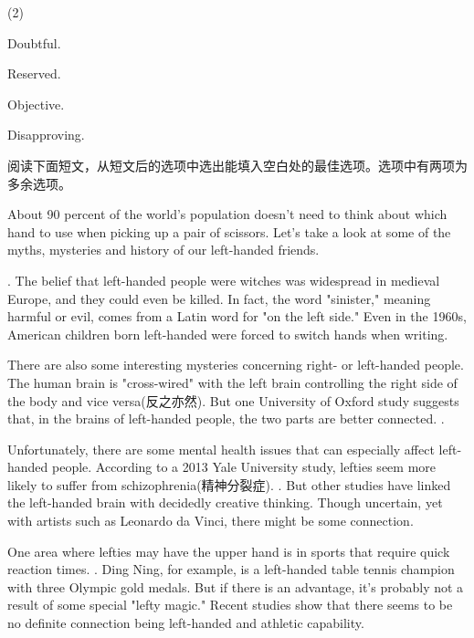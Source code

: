 \documentclass{英语试卷}
\begin{document}
\begin{choices}(2)
  \item Doubtful.
  \item Reserved.
  \item Objective.
  \item Disapproving.
\end{choices}
\par 阅读下面短文，从短文后的选项中选出能填入空白处的最佳选项。选项中有两项为多余选项。\par
\par About 90 percent of the world's population doesn't need to think about which hand to use when picking up a pair of scissors.  Let's take a look at some of the myths, mysteries and history of our left-handed friends.\par
\par {}. The belief that left-handed people were witches was widespread in medieval Europe, and they could even be killed. In fact, the word "sinister," meaning harmful or evil, comes from a Latin word for "on the left side." Even in the 1960s, American children born left-handed were forced to switch hands when writing.\par
\par There are also some interesting mysteries concerning right- or left-handed people. The human brain is "cross-wired" with the left brain controlling the right side of the body and vice versa(反之亦然). But one University of Oxford study suggests that, in the brains of left-handed people, the two parts are better connected. .\par
\par Unfortunately, there are some mental health issues that can especially affect left-handed people. According to a 2013 Yale University study, lefties seem more likely to suffer from schizophrenia(精神分裂症). . But other studies have linked the left-handed brain with decidedly creative thinking. Though uncertain, yet with artists such as Leonardo da Vinci, there might be some connection.\par
\par One area where lefties may have the upper hand is in sports that require quick reaction times. . Ding Ning, for example, is a left-handed table tennis champion with three Olympic gold medals. But if there is an advantage, it's probably not a result of some special "lefty magic." Recent studies show that there seems to be no definite connection being left-handed and athletic capability.\par
\end{document}
